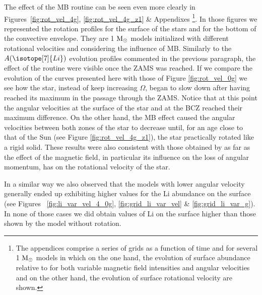 \documentclass[fleqn,usenatbib]{mnras}
\begin{document}
The effect of the MB routine can be seen even more clearly in Figures~\ref{fig:rot_vel_4g}, \ref{fig:rot_vel_4g_z1} \& Appendixes \footnote{The appendices comprise a series of grids as a function of time and for several 1 $\mathrm{M}_\odot$ models in which on the one hand, the evolution of surface  abundance relative to  for both variable magnetic field intensities and angular velocities and on the other hand, the evolution of surface rotational velocity are shown.}. In those figures we represented the rotation profiles for the surface of the stars and for the bottom of the convective envelope. They are 1 $\mathrm{M}_\odot$ models initialized with different rotational velocities and considering the influence of MB. Similarly to the $A(\isotope[7]{Li})$ evolution profiles commented in the previous paragraph, the effect of the routine were visible once the ZAMS was reached. If we compare the evolution of the curves presented here with those of Figure \ref{fig:rot_vel_0g} we see how the star, instead of keep increasing $\Omega$, began to slow down after having reached its maximum in the passage through the ZAMS. Notice that at this point the angular velocities at the surface of the star and at the BCZ reached their maximum difference. On the other hand, the MB effect caused the angular velocities between both zones of the star to decrease until, for an age close to that of the Sun (see Figure \ref{fig:rot_vel_4g_z1}), the star practically rotated like a rigid solid. These results were also consistent with those obtained by \citet{Eggenberger2010} as far as the effect of the magnetic field, in particular its influence on the loss of angular momentum, has on the rotational velocity of the star.\par

In a similar way we also observed that the models with lower angular velocity generally ended up exhibiting higher values for the Li abundance on the surface (see Figures~ \ref{fig:li_var_vel_4_0g}, \ref{fig:grid_li_var_vel} \& \ref{fig:grid_li_var_g}). In none of those cases we did obtain values of Li on the surface higher than those shown by the model without rotation.\par
\end{document}
